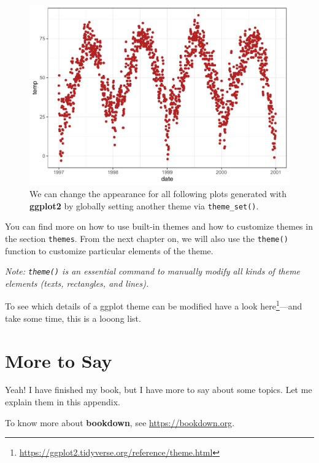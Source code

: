 \documentclass[
]{krantz}
\renewcommand{\href}[2]{#2\footnote{\url{#1}}}
\begin{document}
\begin{figure}
\centering
\includegraphics{bookdown_files/figure-latex/remove-gray-background-1.pdf}
\caption{\label{fig:remove-gray-background}We can change the appearance for all following plots generated with \textbf{ggplot2} by globally setting another theme via \texttt{theme\_set()}.}
\end{figure}

You can find more on how to use built-in themes and how to customize themes in the section \texttt{themes}. From the next chapter on, we will also use the \texttt{theme()} function to customize particular elements of the theme.

\emph{Note: \texttt{theme()} is an essential command to manually modify all kinds of theme elements (texts, rectangles, and lines).}

To see which details of a ggplot theme can be modified have a look \href{https://ggplot2.tidyverse.org/reference/theme.html}{here}---and take some time, this is a looong list.

\cleardoublepage

\hypertarget{appendix-appendix}{%
\appendix {}}


\hypertarget{more-to-say}{%
\chapter{More to Say}\label{more-to-say}}

Yeah! I have finished my book, but I have more to say about some topics. Let me explain them in this appendix.

To know more about \textbf{bookdown}, see \url{https://bookdown.org}.

  

\backmatter
\printindex
\end{document}
